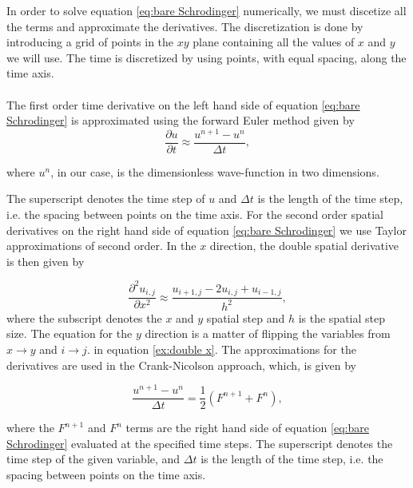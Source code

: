 \documentclass[english,notitlepage,reprint,nofootinbib]{revtex4-2}  %
\begin{document}
	\noindent
	In order to solve equation \ref{eq:bare Schrodinger} numerically, we must discetize all the terms and approximate
	the derivatives. The discretization is done by introducing a grid of points in the
	$xy$ plane containing all the values of $x$ and $y$ we will use. The time is discretized by using points, with equal spacing, along the time axis.\\ \\
	The first order time derivative on the left hand side of equation \ref{eq:bare Schrodinger} is approximated using the forward Euler method given by
	\begin{equation}
		\frac{\partial u}{\partial t} \approx \frac{u^{n+1}-u^n}{\Delta t},
	\end{equation}

	\noindent
	where $u^n$, in our case, is the dimensionless wave-function in two dimensions.

	\noindent
	The superscript denotes the time step of $u$ and $\Delta t$ is the length of the time
	step, i.e. the spacing between points on the time axis.	For the second order spatial derivatives
	on the right hand side of equation \ref{eq:bare Schrodinger}
	we use Taylor approximations of second order. In the $x$ direction,
	the double spatial derivative is then given by
	
	\begin{equation}\label{ex:double x}
		\frac{\partial^2 u_{i,j}}{\partial x^2} \approx \frac{u_{i+1,j}-2u_{i,j}+u_{i-1,j}}{h^2},
	\end{equation}
	where the subscript denotes the $x$ and $y$ spatial step and $h$ is the spatial step size.
	The equation for the $y$ direction is a matter of flipping the variables from
	$x \rightarrow y$ and $i \rightarrow j$.
	in equation \ref{ex:double x}. The approximations for the derivatives are used in
	the Crank-Nicolson approach, which, is given by
	
	\begin{equation}
		\frac{u^{n+1}-u^{n}}{\Delta t} = \frac{1}{2}    \left(     F^{n+1} + F^n     \right),
	\end{equation}

	\noindent
	where the $F^{n+1}$ and $F^n$ terms are the right hand side of equation \ref{eq:bare Schrodinger}
	evaluated at the specified time steps. The superscript denotes the time step of the given variable, and $\Delta t$ is the length of the time step,
	i.e. the spacing between points on the time axis.\\ \\
\end{document}
